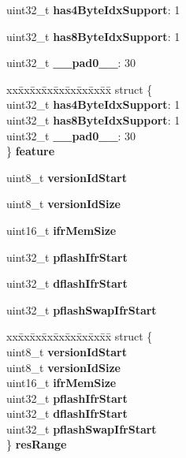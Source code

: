 \begin{DoxyCompactItemize}
\begin{tabbing}
\end{tabbing}\item 
uint32\+\_\+t {\bfseries has4\+Byte\+Idx\+Support}\+: 1
\item 
uint32\+\_\+t {\bfseries has8\+Byte\+Idx\+Support}\+: 1
\item 
uint32\+\_\+t {\bfseries \+\_\+\+\_\+pad0\+\_\+\+\_\+}\+: 30
\item 
\mbox{\label{group__ftfx__controller_ga9dd081c2f02dcf94bedb2f1ba9dc444d}} 
\begin{tabbing}
xx\=xx\=xx\=xx\=xx\=xx\=xx\=xx\=xx\=\kill
struct \{\\
\>uint32\_t {\bfseries has4ByteIdxSupport}: 1\\
\>uint32\_t {\bfseries has8ByteIdxSupport}: 1\\
\>uint32\_t {\bfseries \_\_pad0\_\_}: 30\\
\} {\bfseries feature}\\

\end{tabbing}\item 
uint8\+\_\+t {\bfseries version\+Id\+Start}
\item 
uint8\+\_\+t {\bfseries version\+Id\+Size}
\item 
uint16\+\_\+t {\bfseries ifr\+Mem\+Size}
\item 
uint32\+\_\+t {\bfseries pflash\+Ifr\+Start}
\item 
uint32\+\_\+t {\bfseries dflash\+Ifr\+Start}
\item 
uint32\+\_\+t {\bfseries pflash\+Swap\+Ifr\+Start}
\item 
\mbox{\label{group__ftfx__controller_gabb9199aca296724ebac88d497cfecfa9}} 
\begin{tabbing}
xx\=xx\=xx\=xx\=xx\=xx\=xx\=xx\=xx\=\kill
struct \{\\
\>uint8\_t {\bfseries versionIdStart}\\
\>uint8\_t {\bfseries versionIdSize}\\
\>uint16\_t {\bfseries ifrMemSize}\\
\>uint32\_t {\bfseries pflashIfrStart}\\
\>uint32\_t {\bfseries dflashIfrStart}\\
\>uint32\_t {\bfseries pflashSwapIfrStart}\\
\} {\bfseries resRange}\\


\end{tabbing}
\end{DoxyCompactItemize}
